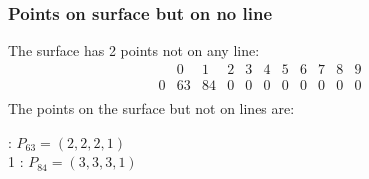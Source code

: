 \documentclass{article}
\begin{document}
{\subsubsection*{Points on surface but on no line}
The surface has 2 points not on any line:\\
$$
\begin{array}{r|*{10}{r}}
 & 0 & 1 & 2 & 3 & 4 & 5 & 6 & 7 & 8 & 9\\
\hline
0 & 63 & 84 & 0 & 0 & 0 & 0 & 0 & 0 & 0 & 0\\
\end{array}
$$
The points on the surface but not on lines are:\\
\begin{multicols}{2}
 : $P_{63}=( 2, 2, 2, 1 )$\\
1 : $P_{84}=( 3, 3, 3, 1 )$\\
\end{multicols}
}
\end{document}
